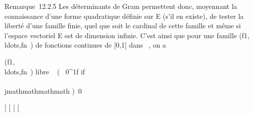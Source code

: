 Remarque~12.2.5 Les déterminants de Gram permettent donc, moyennant la
connaissance d'une forme quadratique définie sur E (s'il en existe), de
tester la liberté d'une famille finie, quel que soit le cardinal de
cette famille et même si l'espace vectoriel E est de dimension infinie.
C'est ainsi que pour une famille
(f1,\\ldots,fn~)
de fonctions continues de {[}0,1{]} dans ~, on a

(f1,\\ldots,fn~)\text
libre  \Leftrightarrow
{}~
\left (\int ~
0^1f if\\\\jmathmathmathmath\right
)\neq~0

{[}
{[}
{[}
{[}
